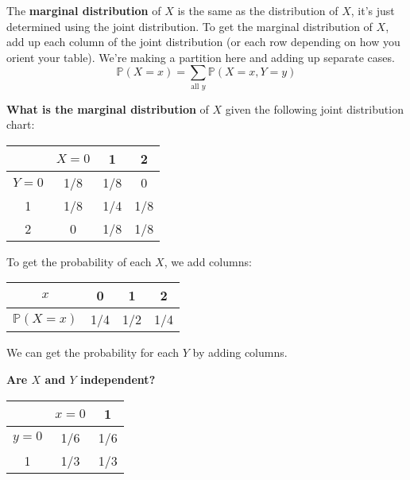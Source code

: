 \documentclass[titlepage, 12pt, leqno]{article}
\begin{document}
\begin{definition}
    The \textbf{marginal distribution} of $X$ is the same as the distribution of
    $X$, it's just determined using the joint distribution. To get the marginal
    distribution of $X$, add up each column of the joint distribution (or each 
    row depending on how you orient your table). We're making a partition here
    and adding up separate cases.
    \[
    \mathbb{P}(X=x)= \sum_{ \text{all }y}\mathbb{P}(X=x, Y=y)
    \]

\end{definition}

\begin{ex}
    \textbf{What is the marginal distribution} of $X$ given the following joint
    distribution chart:

    \vspace{10px}
    \begin{center}
    \begin{tabular}{c|c c c}
    & $X=0$&1&2\\
    \hline
        $Y=0$&1/8&1/8&0\\
        1&1/8&1/4&1/8\\
        2&0&1/8&1/8
    \end{tabular}
    \end{center}
    \vspace{10px}

    To get the probability of each $X$, we add columns:
    \vspace{10px}
    \begin{center}
    \begin{tabular}{c|c c c}
        $x$ &0&1&2 \\
        \hline
        $\mathbb{P}(X=x)$&1/4&1/2&1/4
    \end{tabular}
    \end{center}
    \vspace{10px}
    
    We can get the probability for each $Y$ by adding columns.

    \textbf{Are $X$ and $Y$ independent?} 
    \vspace{10px}
    \begin{center}
    \begin{tabular}{c|c c}
    & $x=0$ &1\\
    \hline
        $y=0$&1/6&1/6\\
        1&1/3&1/3
    \end{tabular}
    \end{center}
    \vspace{10px}


\end{ex}
\end{document}
